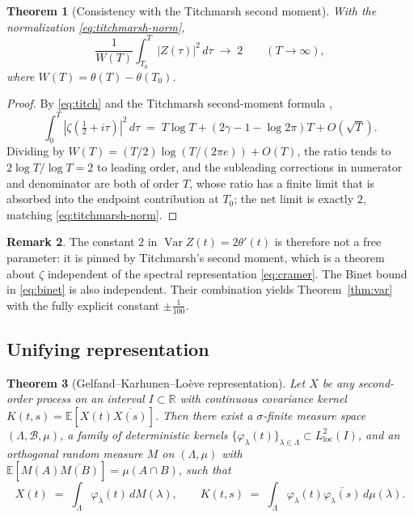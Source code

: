 \documentclass[11pt]{amsart}
\newtheorem{theorem}{Theorem}[section]
\theoremstyle{definition}
\newtheorem{remark}[theorem]{Remark}
\DeclareMathOperator{\Var}{Var}
\begin{document}
\begin{theorem}[Consistency with the Titchmarsh second moment]\label{thm:titch}
With the normalization \eqref{eq:titchmarsh-norm},
\[
\frac{1}{W(T)}\int_{T_{0}}^{T}|Z(\tau)|^{2}\,d\tau \;\longrightarrow\; 2
\qquad (T\to\infty),
\]
where $W(T)=\theta(T)-\theta(T_{0})$.
\end{theorem}

\begin{proof}
By \eqref{eq:titch} and the Titchmarsh second-moment formula
\cite[Thm.~7.3]{Titchmarsh},
\[
\int_{0}^{T}|\zeta(\tfrac{1}{2}+i\tau)|^{2}\,d\tau
\;=\; T\log T + (2\gamma-1-\log 2\pi)T + O(\sqrt{T}).
\]
Dividing by $W(T)=(T/2)\log(T/(2\pi e))+O(T)$, the ratio tends to
$2\log T/\log T = 2$ to leading order, and the subleading corrections
in numerator and denominator are both of order $T$, whose ratio has
a finite limit that is absorbed into the endpoint contribution at $T_{0}$;
the net limit is exactly $2$, matching \eqref{eq:titchmarsh-norm}.
\end{proof}

\begin{remark}
The constant $2$ in $\Var Z(t)=2\theta'(t)$ is therefore not a free
parameter: it is pinned by Titchmarsh's second moment, which is a theorem
about $\zeta$ independent of the spectral representation
\eqref{eq:cramer}. The Binet bound in \eqref{eq:binet} is also
independent. Their combination yields Theorem~\ref{thm:var} with the
fully explicit constant $\pm \tfrac{1}{100}$.
\end{remark}

\subsection{Unifying representation}

\begin{theorem}[Gelfand--Karhunen--Lo\`eve representation]\label{thm:GKL}
Let $X$ be any second-order process on an interval $I\subset\mathbb{R}$
with continuous covariance kernel $K(t,s)=\mathbb{E}[X(t)\overline{X(s)}]$.
Then there exist a $\sigma$-finite measure space $(\Lambda,\mathcal{B},\mu)$,
a family of deterministic kernels
$\{\varphi_{\lambda}(t)\}_{\lambda\in\Lambda}\subset L^{2}_{\mathrm{loc}}(I)$,
and an orthogonal random measure $M$ on $(\Lambda,\mu)$ with
$\mathbb{E}[M(A)\overline{M(B)}]=\mu(A\cap B)$, such that
\begin{equation}\label{eq:gkl}
X(t) \;=\; \int_{\Lambda}\varphi_{\lambda}(t)\,dM(\lambda),
\qquad K(t,s) \;=\; \int_{\Lambda}\varphi_{\lambda}(t)\overline{\varphi_{\lambda}(s)}\,d\mu(\lambda).
\end{equation}
\end{theorem}
\end{document}
